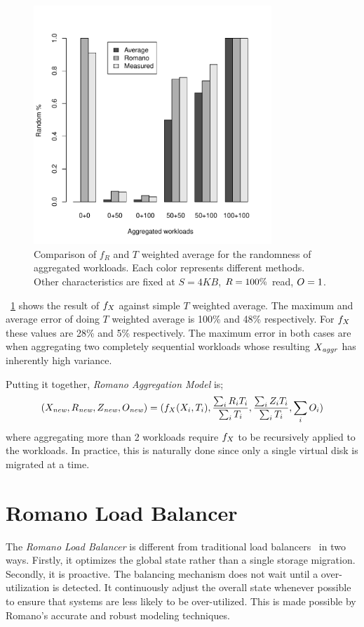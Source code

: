 \begin{figure}[!t]
\centering
\includegraphics[width=0.8\textwidth]{figure/random_accuracy.pdf}
\captionsetup{format=myformat}
\caption{Comparison of $f_R$ and $T$ weighted average for the randomness of aggregated workloads.
Each color represents different methods.
Other characteristics are fixed at $S=4\mathit{KB}$, $R=100\%$ read, $O=1$.
}
\label{randmix}
\end{figure}
\figurename~\ref{randmix} shows the result of $f_{X}$ against simple $T$ weighted average.
The maximum and average error of doing $T$ weighted average is 100\% and 48\% respectively.
For $f_{X}$ these values are 28\% and 5\% respectively.
The maximum error in both cases are when aggregating two completely sequential workloads whose resulting ${X}_{\mathit{aggr}}$ has inherently high variance.

Putting it together, \emph{Romano Aggregation Model} is;
\begin{equation}\label{sumFun}
(X_{\mathit{new}}, R_{\mathit{new}}, Z_{\mathit{new}}, O_{\mathit{new}}) \\
  = (f_{X}({X}_i, T_i), \frac{\sum_{i} {R}_i T_i}{\sum_{i} T_i}, \frac{\sum_{i} {Z}_i T_i}{\sum_{i} T_i}, \sum_{i} {O}_i)
\end{equation}
where aggregating more than 2 workloads require $f_{X}$ to be recursively applied to the workloads.
In practice, this is naturally done since only a single virtual disk is migrated at a time.

\section{Romano Load Balancer}
The \emph{Romano Load Balancer} is different from traditional load balancers~\cite{gulati:2010, gulati:2011, singh:2008} in two ways.
Firstly, it optimizes the global state rather than a single storage migration.
Secondly, it is proactive.
The balancing mechanism does not wait until a over-utilization is detected.
It continuously adjust the overall state whenever possible to ensure that systems are less likely to be over-utilized.
This is made possible by Romano's accurate and robust modeling techniques.

